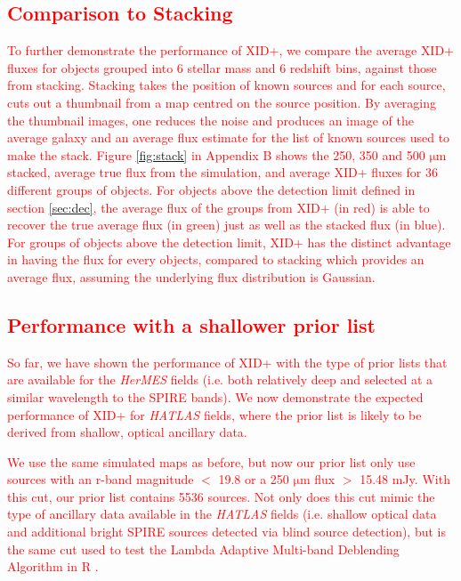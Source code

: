\documentclass[useAMS,usenatbib]{mnras}
\begin{document}
\textcolor{red}{\subsection{Comparison to Stacking}}
\textcolor{red}{To further demonstrate the performance of \textsc{XID+}, we compare the average \textsc{XID+} fluxes for objects grouped into 6 stellar mass and 6 redshift bins, against those from stacking. Stacking takes the position of known sources and for each source, cuts out a thumbnail from a map centred on the source position. By averaging the thumbnail images, one reduces the noise and produces an image of the average galaxy and an average flux estimate for the list of known sources used to make the stack. Figure \ref{fig:stack} in Appendix B shows the 250, 350 and 500 $\mathrm{\mu m}$ stacked, average true flux from the simulation, and average \textsc{XID+} fluxes for 36 different groups of objects. For objects above the detection limit defined in section \ref{sec:dec}, the average flux of the groups from \textsc{XID+} (in red) is able to recover the true average flux (in green) just as well as the stacked flux (in blue). For groups of objects above the detection limit, \textsc{XID+} has the distinct advantage in having the flux for every objects, compared to stacking which provides an average flux, assuming the underlying flux distribution is Gaussian.
}

\textcolor{red}{\subsection{Performance with a shallower prior list}}
\textcolor{red}{So far, we have shown the performance of \textsc{XID+} with the type of prior lists that are available for the \emph{HerMES} fields (i.e. both relatively deep and selected at a similar wavelength to the SPIRE bands). We now demonstrate the expected performance of \textsc{XID+} for \emph{HATLAS} fields, where the prior list is likely to be derived from shallow, optical ancillary data.}

\textcolor{red}{We use the same simulated maps as before, but now our prior list only use sources with an r-band magnitude $<$ 19.8 or a 250 $\mathrm{\mu m}$ flux $>$ 15.48 mJy. With this cut, our prior list contains 5536 sources. Not only does this cut mimic the type of ancillary data available in the \emph{HATLAS} fields (i.e. shallow optical data and additional bright SPIRE sources detected via blind source detection), but is the same cut used to test the Lambda Adaptive Multi-band Deblending Algorithm in R \citep[LAMBDAR][]{Wright:2016}.}
\end{document}
